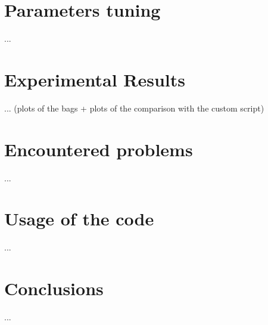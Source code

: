 \documentclass[11pt,a4paper]{article}
\begin{document}
\section{Parameters tuning}

...



%

\section{Experimental Results}

... (plots of the bags + plots of the comparison with the custom script)



%

\section{Encountered problems}

...



%

\section{Usage of the code}

...




\section{Conclusions}

...
\end{document}
